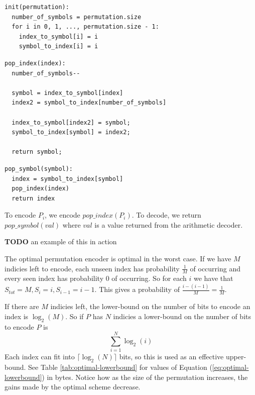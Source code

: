 \documentclass[a4paper]{report}
\newcommand{\todo}{\textbf{TODO} }
\begin{document}
\begin{verbatim}
init(permutation):
  number_of_symbols = permutation.size
  for i in 0, 1, ..., permutation.size - 1:
    index_to_symbol[i] = i
    symbol_to_index[i] = i
\end{verbatim}

\begin{verbatim}
pop_index(index):
  number_of_symbols--

  symbol = index_to_symbol[index]
  index2 = symbol_to_index[number_of_symbols]

  index_to_symbol[index2] = symbol;
  symbol_to_index[symbol] = index2;

  return symbol;
\end{verbatim}

\begin{verbatim}
pop_symbol(symbol):
  index = symbol_to_index[symbol]
  pop_index(index)
  return index
\end{verbatim}

To encode $P_i$, we encode $pop\_index(P_i)$. To decode, we return
$pop\_symbol(val)$ where $val$ is a value returned from the arithmetic
decoder.

\todo an example of this in action

The optimal permutation encoder is optimal in the worst case. If we have $M$
indicies left to encode, each unseen index has probability $\frac{1}{M}$ of
occurring and every seen index has probability $0$ of occurring. So for each
$i$ we have that $S_{tot}=M, S_i = i, S_{i-1} = i-1$. This gives a probability
of $\frac{i-(i-1)}{M} = \frac{1}{M}$.

If there are $M$ indicies left, the lower-bound on the number of bits to
encode an index is $\log_2(M)$. So if $P$ has $N$ indicies a lower-bound on
the number of bits to encode $P$ is
\begin{equation}
  \displaystyle\sum^{N}_{i=1} \log_2(i)
  \label{eq:optimal-lowerbound}
\end{equation}
Each index can fit into $\lceil\log_2(N)\rceil$ bits, so this is used as an
effective upper-bound. See Table \ref{tab:optimal-lowerbound} for values of
Equation (\ref{eq:optimal-lowerbound}) in bytes. Notice how as the size of the
permutation increases, the gains made by the optimal scheme decrease.
\end{document}
